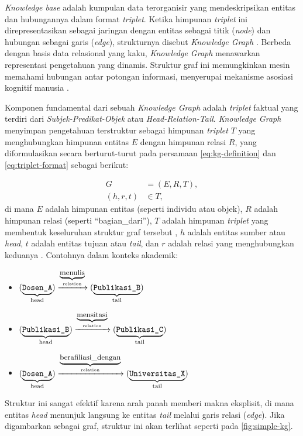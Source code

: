 \textit{Knowledge base} adalah kumpulan data terorganisir yang mendeskripsikan entitas dan hubungannya dalam format \textit{triplet}. Ketika himpunan \textit{triplet} ini direpresentasikan sebagai jaringan dengan entitas sebagai titik (\textit{node}) dan hubungan sebagai garis (\textit{edge}), strukturnya disebut \textit{Knowledge Graph} \citep{mondal2021end}. Berbeda dengan basis data relasional yang kaku, \textit{Knowledge Graph} menawarkan representasi pengetahuan yang dinamis. Struktur graf ini memungkinkan mesin memahami hubungan antar potongan informasi, menyerupai mekanisme asosiasi kognitif manusia \citep{cheng2025humancognitioninspiredrag}.

Komponen fundamental dari sebuah \textit{Knowledge Graph} adalah \textit{triplet} faktual yang terdiri dari \textit{Subjek-Predikat-Objek} atau \textit{Head-Relation-Tail}. \textit{Knowledge Graph} menyimpan pengetahuan terstruktur sebagai himpunan \textit{triplet} $T$ yang menghubungkan himpunan entitas $E$ dengan himpunan relasi $R$, yang diformulasikan secara berturut-turut pada persamaan \eqref{eq:kg-definition} dan \eqref{eq:triplet-format} sebagai berikut:

\begin{align}
    G         &= (E, R, T), \label{eq:kg-definition} \\
    (h, r, t) &\in T, \label{eq:triplet-format}
\end{align}
di mana $E$ adalah himpunan entitas (seperti individu atau objek), $R$ adalah himpunan relasi (seperti ``bagian\_dari''), $T$ adalah himpunan \textit{triplet} yang membentuk keseluruhan struktur graf tersebut \citep{Hogan_2021}, $h$ adalah entitas sumber atau \textit{head}, $t$ adalah entitas tujuan atau \textit{tail}, dan $r$ adalah relasi yang menghubungkan keduanya \citep{peng2023knowledge}. Contohnya dalam konteks akademik:
\begin{itemize}
    \item $(\underbrace{\text{\texttt{Dosen\_A}}}_{\text{head}}) \xrightarrow{\underbrace{\text{\small menulis}}_{\text{relation}}} (\underbrace{\text{\texttt{Publikasi\_B}}}_{\text{tail}})$
    \item $(\underbrace{\text{\texttt{Publikasi\_B}}}_{\text{head}}) \xrightarrow{\underbrace{\text{\small mensitasi}}_{\text{relation}}} (\underbrace{\text{\texttt{Publikasi\_C}}}_{\text{tail}})$
    \item $(\underbrace{\text{\texttt{Dosen\_A}}}_{\text{head}}) \xrightarrow{\underbrace{\text{\small berafiliasi\_dengan}}_{\text{relation}}} (\underbrace{\text{\texttt{Universitas\_X}}}_{\text{tail}})$
\end{itemize}
Struktur ini sangat efektif karena arah panah memberi makna eksplisit, di mana entitas \textit{head} menunjuk langsung ke entitas \textit{tail} melalui garis relasi (\textit{edge}). Jika digambarkan sebagai graf, struktur ini akan terlihat seperti pada \ref{fig:simple-kg}.

